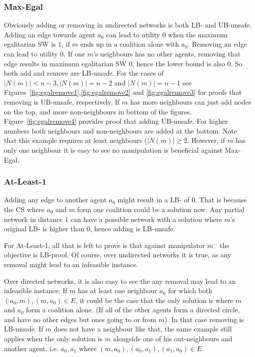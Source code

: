 \subsubsection*{Max-Egal}
Obviously adding or removing in undirected networks is both LB- and UB-unsafe. Adding an edge towards agent $a_0$ can lead to utility $0$ when the maximum egalitarian SW is $1$, if $m$ ends up in a coalition alone with $a_0$.
Removing an edge can lead to utility $0$. If one $m$'s neighbours has no other agents, removing that edge results in maximum egalitarian SW $0$, hence the lower bound is also $0$. So both add and remove are LB-unsafe.
For the cases of $|N(m)|<n-3, |N(m)|=n-2$ and $|N(m)|=n-1$ see Figures~\ref{fig:egalremove1},\ref{fig:egalremove2} and \ref{fig:egalremove3} for proofs that removing is UB-unsafe, respectively. If $m$ has more neighbours can just add nodes on the top, and more non-neighbours in bottom of the figures.
Figure~\ref{fig:egalremove4} provides proof that adding UB-unsafe. For higher numbers both neighbours and non-neighbours are added at the bottom. Note that this example requires at least neighbours ($|N(m)|\geq2$. However, if $m$ has only one neighbour it is easy to see no manipulation is beneficial against Max-Egal.


\subsubsection*{At-Least-1}
Adding any edge to another agent $a_0$ might result in a LB- of $0$. That is because the CS where $a_0$ and $m$ form one coalition could be a solution now.
Any partial network in distance 1 can have a possible network with a solution where $m$'s original LB- is higher than $0$, hence adding is LB-unsafe.



For At-Least-1, all that is left to prove is that against manipulator $m^-$ the objective is LB-proof. Of course, over undirected networks it is true, as any removal might lead to an infeasible instance.

Over directed networks, it is also easy to see the any removal may lead to an infeasible instance; If $m$ has at least one neighbour $a_0$ for which both $(a_0,m),(m,a_0)\in E $, it could be the case that the only solution is where $m$ and $a_0$ form a coalition alone. (If all of the other agents form a directed circle, and have no other edges but ones going to or from $m$). In that case removing is LB-unsafe.
If $m$ does not have a neighbour like that, the same example still applies when the only solution is $m$ alongside one of his out-neighbours and another agent. i.e. $a_0,a_1$ where $(m,a_0),(a_0,a_1),(a_1,a_0)\in E$.


